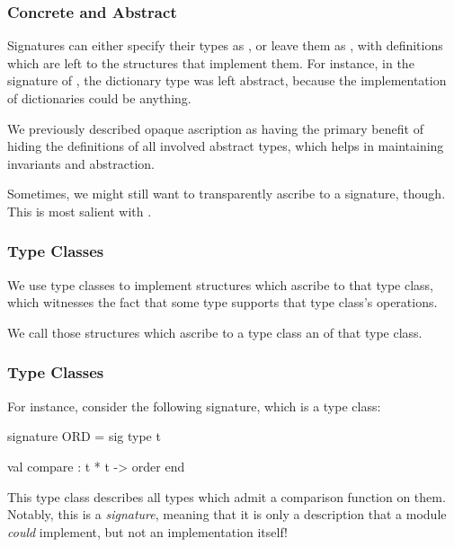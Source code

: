 \documentclass[aspectratio=169]{beamer}
\begin{document}


\begin{frame}[fragile]
  \frametitle{Concrete and Abstract}

  Signatures can either specify their types as , or leave
  them as , with definitions which are left to the
  structures that implement them. For instance, in the signature of
  , the dictionary type  was left abstract,
  because the implementation of dictionaries could be anything.

  \pause
  \vspace{\fill}

  We previously described opaque ascription as having the primary benefit of
  hiding the definitions of all involved abstract types, which helps in
  maintaining invariants and abstraction.

  \pause
  \vspace{\fill}

  Sometimes, we might still want to transparently ascribe to a signature, though.
  This is most salient with .
\end{frame}

\begin{frame}[fragile]
  \frametitle{Type Classes}


  \pause
  \vspace{\fill}

  We use type classes to implement structures which ascribe to that type class,
  which witnesses the fact that some type supports that type class's operations.

  \pause
  \vspace{\fill}

  We call those structures which ascribe to a type class an  of
  that type class.
\end{frame}

\begin{frame}[fragile]
  \frametitle{Type Classes}
  For instance, consider the following signature, which is a type class:
  \begin{codeblock}
    signature ORD =
      sig
        type t

        val compare : t * t -> order
      end
  \end{codeblock}

  \pause
  \vspace{\fill}

  This type class describes all types which admit a comparison function on them.
  Notably, this is a \textit{signature}, meaning that it is only a description
  that a module \textit{could} implement, but not an implementation itself!
\end{frame}
\end{document}
